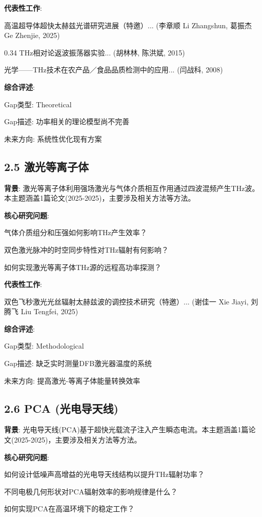 \documentclass[12pt]{article}
\begin{document}
\textbf{代表性工作}:
\item [1] 高温超导体超快太赫兹光谱研究进展（特邀）... (李章顺 Li Zhangshun, 葛振杰 Ge Zhenjie, 2025)
\item [2] 0.34 THz相对论返波振荡器实验... (胡林林, 陈洪斌, 2015)
\item [3] 光学——THz技术在农产品／食品品质检测中的应用... (闫战科, 2008)

\textbf{综合评述}:
\item Gap类型: Theoretical
\item Gap描述: 功率相关的理论模型尚不完善
\item 未来方向: 系统性优化现有方案


\subsection{2.5 激光等离子体}

\textbf{背景}: 激光等离子体利用强场激光与气体介质相互作用通过四波混频产生THz波。本主题涵盖1篇论文(2025-2025)，主要涉及相关方法等方法。

\textbf{核心研究问题}:
\item 气体介质组分和压强如何影响THz产生效率？
\item 双色激光脉冲的时空同步特性对THz辐射有何影响？
\item 如何实现激光等离子体THz源的远程高功率探测？

\textbf{代表性工作}:
\item [1] 双色飞秒激光光丝辐射太赫兹波的调控技术研究（特邀）... (谢佳一 Xie Jiayi, 刘腾飞 Liu Tengfei, 2025)

\textbf{综合评述}:
\item Gap类型: Methodological
\item Gap描述: 缺乏实时测量DFB激光器温度的系统
\item 未来方向: 提高激光-等离子体能量转换效率


\subsection{2.6 PCA (光电导天线)}

\textbf{背景}: 光电导天线(PCA)基于超快光载流子注入产生瞬态电流。本主题涵盖1篇论文(2025-2025)，主要涉及相关方法等方法。

\textbf{核心研究问题}:
\item 如何设计低噪声高增益的光电导天线结构以提升THz辐射功率？
\item 不同电极几何形状对PCA辐射效率的影响规律是什么？
\item 如何实现PCA在高温环境下的稳定工作？
\end{document}
